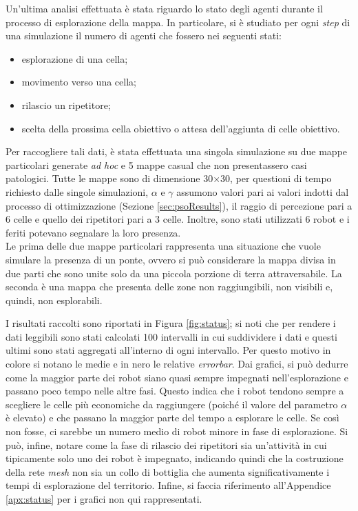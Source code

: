 Un'ultima analisi effettuata è stata riguardo lo stato degli agenti durante il processo di esplorazione della mappa.
In particolare, si è studiato per ogni \textit{step} di una simulazione il numero di agenti che fossero nei seguenti stati:
\begin{itemize}
	\item esplorazione di una cella;
	\item movimento verso una cella;
	\item rilascio un ripetitore;
	\item scelta della prossima cella obiettivo o attesa dell'aggiunta di celle obiettivo.
\end{itemize}
Per raccogliere tali dati, è stata effettuata una singola simulazione su due mappe particolari generate \textit{ad hoc} e 5 mappe casual che non presentassero casi patologici.
Tutte le mappe sono di dimensione 30$\times$30, per questioni di tempo richiesto dalle singole simulazioni, $\alpha$ e $\gamma$ assumono valori pari ai valori indotti dal processo di ottimizzazione (Sezione \ref{sec:psoResults}), il raggio di percezione pari a 6 celle e quello dei ripetitori pari a 3 celle.
Inoltre, sono stati utilizzati 6 robot e i feriti potevano segnalare la loro presenza.\\
Le prima delle due mappe particolari rappresenta una situazione che vuole simulare la presenza di un ponte, ovvero si può considerare la mappa divisa in due parti che sono unite solo da una piccola porzione di terra attraversabile.
La seconda è una mappa che presenta delle zone non raggiungibili, non visibili e, quindi, non esplorabili.

I risultati raccolti sono riportati in Figura \ref{fig:status}; si noti che per rendere i dati leggibili sono stati calcolati 100 intervalli in cui suddividere i dati e questi ultimi sono stati aggregati all'interno di ogni intervallo. Per questo motivo in colore si notano le medie e in nero le relative \textit{errorbar}.
Dai grafici, si può dedurre come la maggior parte dei robot siano quasi sempre impegnati nell'esplorazione e passano poco tempo nelle altre fasi. Questo indica che i robot tendono sempre a scegliere le celle più economiche da raggiungere (poiché il valore del parametro $\alpha$ è elevato) e che passano la maggior parte del tempo a esplorare le celle.
Se così non fosse, ci sarebbe un numero medio di robot minore in fase di esplorazione.
Si può, infine, notare come la fase di rilascio dei ripetitori sia un'attività in cui tipicamente solo uno dei robot è impegnato, indicando quindi che la costruzione della rete \textit{mesh} non sia un collo di bottiglia che aumenta significativamente i tempi di esplorazione del territorio.
Infine, si faccia riferimento all'Appendice \ref{apx:status} per i grafici non qui rappresentati.

